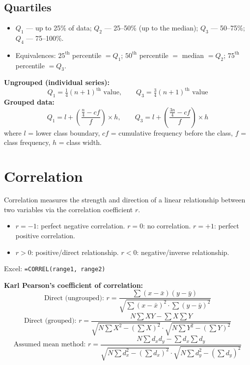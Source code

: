 \documentclass[11pt]{article}
\begin{document}
	\subsection{Quartiles}
	\begin{itemize}[leftmargin=*]
		\item $Q_1$ --- up to 25\% of data; $Q_2$ --- 25--50\% (up to the median); $Q_3$ --- 50--75\%; $Q_4$ --- 75--100\%.
		\item Equivalences: $25^{\text{th}}$ percentile $=Q_1$; $50^{\text{th}}$ percentile $=$ median $=Q_2$; $75^{\text{th}}$ percentile $=Q_3$.
	\end{itemize}
	
	\begin{formulabox}
		\textbf{Ungrouped (individual series):}
		\[
		Q_1 = \tfrac{1}{4}(n+1)^{\text{th}}\text{ value}, \qquad Q_3 = \tfrac{3}{4}(n+1)^{\text{th}}\text{ value}
		\]
		\textbf{Grouped data:}
		\[
		Q_1 = l + \left(\frac{\frac{n}{4}-cf}{f}\right)\times h, \qquad Q_3 = l + \left(\frac{\frac{3n}{4}-cf}{f}\right)\times h
		\]
		where $l$ = lower class boundary, $cf$ = cumulative frequency before the class, $f$ = class frequency, $h$ = class width.
	\end{formulabox}
	
	\section{Correlation}
	
	Correlation measures the strength and direction of a linear relationship between two variables via the correlation coefficient $r$.
	
	\begin{itemize}[leftmargin=*]
		\item $r = -1$: perfect negative correlation. \quad $r = 0$: no correlation. \quad $r = +1$: perfect positive correlation.
		\item $r > 0$: positive/direct relationship. \quad $r < 0$: negative/inverse relationship.
	\end{itemize}
	
	Excel: \texttt{=CORREL(range1, range2)}
	
	\begin{formulabox}
		\textbf{Karl Pearson's coefficient of correlation:}
		\[
		\text{Direct (ungrouped): } r = \frac{\sum (x-\bar x)(y-\bar y)}{\sqrt{\sum (x-\bar x)^2 \cdot \sum (y-\bar y)^2}}
		\]
		\[
		\text{Direct (grouped): } r = \frac{N\sum XY - \sum X \sum Y}{\sqrt{N\sum X^2 - (\sum X)^2}\cdot\sqrt{N\sum Y^2 - (\sum Y)^2}}
		\]
		\[
		\text{Assumed mean method: } r = \frac{N\sum d_xd_y - \sum d_x \sum d_y}{\sqrt{N\sum d_x^2 - (\sum d_x)^2}\cdot\sqrt{N\sum d_y^2 - (\sum d_y)^2}}
		\]
	\end{formulabox}
	
\end{document}

